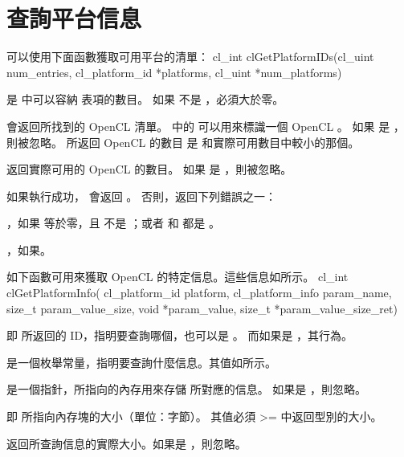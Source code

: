 \section{查詢平台信息}
可以使用下面函數獲取可用平台的清單：
\startclc
cl_int clGetPlatformIDs(cl_uint num_entries,
			cl_platform_id *platforms,
			cl_uint *num_platforms)
\stopclc

 是  中可以容納  表項的數目。
如果  不是 ，必須大於零。

 會返回所找到的 OpenCL  清單。
 中的  可以用來標識一個 OpenCL 。
如果  是 ，則被忽略。
所返回 OpenCL  的數目 是  和實際可用數目中較小的那個。

 返回實際可用的 OpenCL  的數目。
如果  是 ，則被忽略。

如果執行成功， 會返回 。
否則，返回下列錯誤之一：
\startigBase
\item {}，如果  等於零，且  不是 ；或者  和  都是 。
\item {}，如果\schostfailres。
\stopigBase

如下函數可用來獲取 OpenCL 的特定信息。這些信息如所示。
\startclc
cl_int clGetPlatformInfo(
		cl_platform_id platform,
		cl_platform_info param_name,
		size_t param_value_size,
		void *param_value,
		size_t *param_value_size_ret)
\stopclc

 即  所返回的 ID，指明要查詢哪個，也可以是 。
而如果是 ，其行為。

 是一個枚舉常量，指明要查詢什麼信息。其值如所示。

 是一個指針，所指向的內存用來存儲  所對應的信息。
如果是 ，則忽略。

 即  所指向內存塊的大小（單位：字節）。
其值必須 >= 中返回型別的大小。

 返回所查詢信息的實際大小。如果是 ，則忽略。

